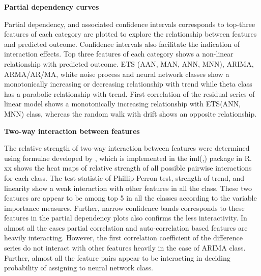 \documentclass[11pt,a4paper,]{article}
\theoremstyle{definition}
\theoremstyle{definition}
\theoremstyle{definition}
\theoremstyle{remark}
\begin{document}
\textbf{Partial dependency curves}

Partial dependency, and associated confidence intervals corresponds to
top-three features of each category are plotted to explore the
relationship between features and predicted outcome. Confidence
intervals also facilitate the indication of interaction effects. Top
three features of each category shows a non-linear relationship with
predicted outcome. ETS (AAN, MAN, ANN, MNN), ARIMA, ARMA/AR/MA, white
noise process and neural network classes show a monotonically increasing
or decreasing relationship with trend while theta class has a parabolic
relationship with trend. First correlation of the residual series of
linear model shows a monotonically increasing relationship with ETS(ANN,
MNN) class, whereas the random walk with drift shows an opposite
relationship.

\textbf{Two-way interaction between features}

The relative strength of two-way interaction between features were
determined using formulae developed by
\textcite{friedman2008predictive}, which is implemented in the
iml(\textcite{molnar2018iml},) package in R. xx shows the heat maps of
relative strength of all possible pairwise interactions for each class.
The test statistic of Phillip-Perron test, strength of trend, and
linearity show a weak interaction with other features in all the class.
These two features are appear to be among top 5 in all the classes
according to the variable importance measures. Further, narrow
confidence bands corresponds to these features in the partial dependency
plots also confirms the less interactivity. In almost all the cases
partial correlation and auto-correlation based features are heavily
interacting. However, the first correlation coefficient of the
difference series do not interact with other features heavily in the
case of ARIMA class. Further, almost all the feature pairs appear to be
interacting in deciding probability of assigning to neural network
class.

\newpage
\end{document}
